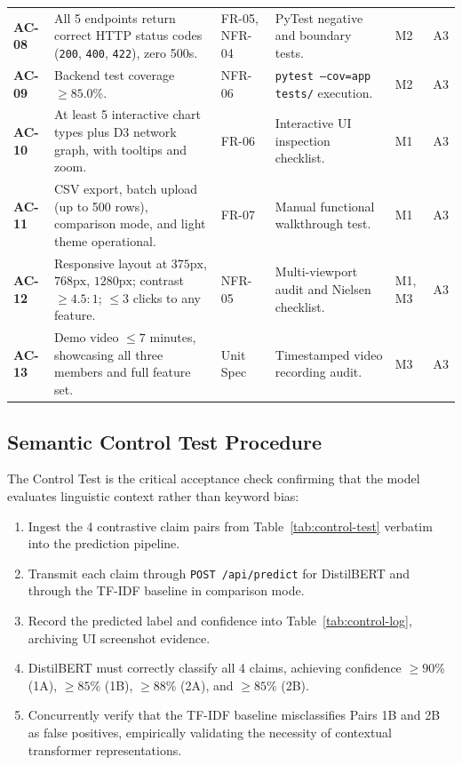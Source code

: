 \documentclass[11pt, a4paper]{article}
\newcommand{\code}[1]{\texttt{\small #1}}
\begin{document}
\begin{table}[H]
\begin{tabularx}{\textwidth}{@{}C{1.1cm} Y C{2.2cm} L{3.5cm} C{0.8cm} C{0.8cm}@{}}
    \textbf{AC-08} & All 5 endpoints return correct HTTP status codes (\code{200}, \code{400}, \code{422}), zero 500s. & FR-05, NFR-04 & PyTest negative and boundary tests. & M2 & A3 \\
    \textbf{AC-09} & Backend test coverage $\ge 85.0$\%. & NFR-06 & \code{pytest --cov=app tests/} execution. & M2 & A3 \\
    \textbf{AC-10} & At least 5 interactive chart types plus D3 network graph, with tooltips and zoom. & FR-06 & Interactive UI inspection checklist. & M1 & A3 \\
    \textbf{AC-11} & CSV export, batch upload (up to 500 rows), comparison mode, and light theme operational. & FR-07 & Manual functional walkthrough test. & M1 & A3 \\
    \textbf{AC-12} & Responsive layout at $375\text{px}$, $768\text{px}$, $1280\text{px}$; contrast $\ge 4.5:1$; $\le 3$ clicks to any feature. & NFR-05 & Multi-viewport audit and Nielsen checklist. & M1, M3 & A3 \\
    \textbf{AC-13} & Demo video $\le 7$ minutes, showcasing all three members and full feature set. & Unit Spec & Timestamped video recording audit. & M3 & A3 \\
    \bottomrule
  \end{tabularx}
\end{table}

\subsection{Semantic Control Test Procedure}
\label{sec:control-procedure}
The Control Test is the critical acceptance check confirming that the model evaluates linguistic context rather than keyword bias:
\begin{enumerate}
  \item Ingest the 4 contrastive claim pairs from Table~\ref{tab:control-test} verbatim into the prediction pipeline.
  \item Transmit each claim through \code{POST /api/predict} for DistilBERT and through the TF-IDF baseline in comparison mode.
  \item Record the predicted label and confidence into Table~\ref{tab:control-log}, archiving UI screenshot evidence.
  \item DistilBERT must correctly classify all 4 claims, achieving confidence $\ge 90$\% (1A), $\ge 85$\% (1B), $\ge 88$\% (2A), and $\ge 85$\% (2B).
  \item Concurrently verify that the TF-IDF baseline misclassifies Pairs 1B and 2B as false positives, empirically validating the necessity of contextual transformer representations.
\end{enumerate}
\end{document}

